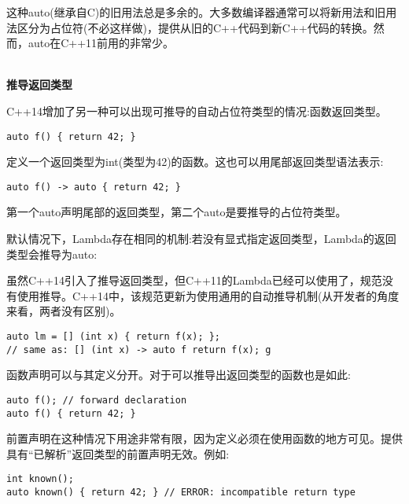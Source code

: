 这种auto(继承自C)的旧用法总是多余的。大多数编译器通常可以将新用法和旧用法区分为占位符(不必这样做)，提供从旧的C++代码到新C++代码的转换。然而，auto在C++11前用的非常少。

\hspace*{\fill} \\ %
\noindent
\textbf{推导返回类型}

C++14增加了另一种可以出现可推导的自动占位符类型的情况:函数返回类型。

\begin{lstlisting}[style=styleCXX]
auto f() { return 42; }
\end{lstlisting}

定义一个返回类型为int(类型为42)的函数。这也可以用尾部返回类型语法表示:

\begin{lstlisting}[style=styleCXX]
auto f() -> auto { return 42; }
\end{lstlisting}

第一个auto声明尾部的返回类型，第二个auto是要推导的占位符类型。

默认情况下，Lambda存在相同的机制:若没有显式指定返回类型，Lambda的返回类型会推导为auto:

\begin{tcolorbox}[colback=webgreen!5!white,colframe=webgreen!75!black]
\hspace*{0.75cm}虽然C++14引入了推导返回类型，但C++11的Lambda已经可以使用了，规范没有使用推导。C++14中，该规范更新为使用通用的自动推导机制(从开发者的角度来看，两者没有区别)。
\end{tcolorbox}

\begin{lstlisting}[style=styleCXX]
auto lm = [] (int x) { return f(x); };
// same as: [] (int x) -> auto f return f(x); g
\end{lstlisting}

函数声明可以与其定义分开。对于可以推导出返回类型的函数也是如此:

\begin{lstlisting}[style=styleCXX]
auto f(); // forward declaration
auto f() { return 42; }
\end{lstlisting}

前置声明在这种情况下用途非常有限，因为定义必须在使用函数的地方可见。提供具有“已解析”返回类型的前置声明无效。例如:

\begin{lstlisting}[style=styleCXX]
int known();
auto known() { return 42; } // ERROR: incompatible return type
\end{lstlisting}


